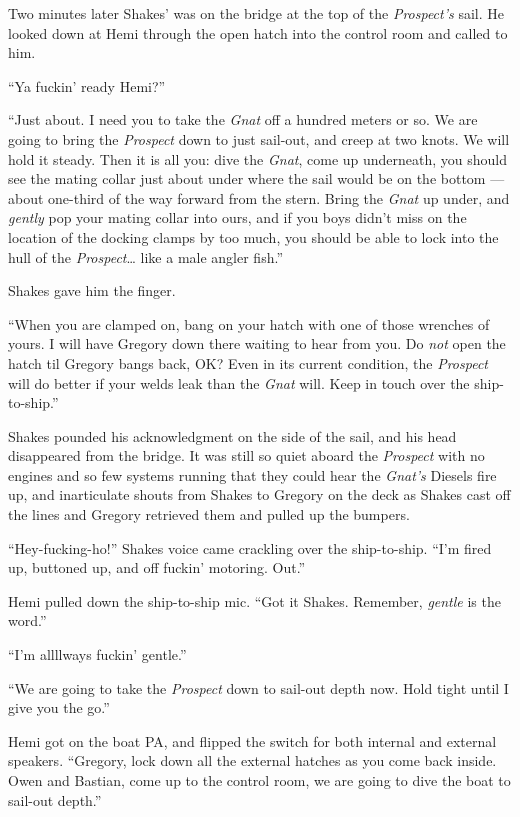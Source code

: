 \documentclass[
]{scrbook}
\begin{document}
Two minutes later Shakes' was on the bridge at the top of the
\emph{Prospect's} sail. He looked down at Hemi through the open hatch
into the control room and called to him.

``Ya fuckin' ready Hemi?''

``Just about. I need you to take the \emph{Gnat} off a hundred meters or
so. We are going to bring the \emph{Prospect} down to just sail-out, and
creep at two knots. We will hold it steady. Then it is all you: dive the
\emph{Gnat}, come up underneath, you should see the mating collar just
about under where the sail would be on the bottom --- about one-third of
the way forward from the stern. Bring the \emph{Gnat} up under, and
\emph{gently} pop your mating collar into ours, and if you boys didn't
miss on the location of the docking clamps by too much, you should be
able to lock into the hull of the \emph{Prospect}\ldots{} like a male
angler fish.''

Shakes gave him the finger.

``When you are clamped on, bang on your hatch with one of those wrenches
of yours. I will have Gregory down there waiting to hear from you. Do
\emph{not} open the hatch til Gregory bangs back, OK? Even in its
current condition, the \emph{Prospect} will do better if your welds leak
than the \emph{Gnat} will. Keep in touch over the ship-to-ship.''

Shakes pounded his acknowledgment on the side of the sail, and his head
disappeared from the bridge. It was still so quiet aboard the
\emph{Prospect} with no engines and so few systems running that they
could hear the \emph{Gnat's} Diesels fire up, and inarticulate shouts
from Shakes to Gregory on the deck as Shakes cast off the lines and
Gregory retrieved them and pulled up the bumpers.

``Hey-fucking-ho!'' Shakes voice came crackling over the ship-to-ship.
``I'm fired up, buttoned up, and off fuckin' motoring. Out.''

Hemi pulled down the ship-to-ship mic. ``Got it Shakes. Remember,
\emph{gentle} is the word.''

``I'm allllways fuckin' gentle.''

``We are going to take the \emph{Prospect} down to sail-out depth now.
Hold tight until I give you the go.''

Hemi got on the boat PA, and flipped the switch for both internal and
external speakers. ``Gregory, lock down all the external hatches as you
come back inside. Owen and Bastian, come up to the control room, we are
going to dive the boat to sail-out depth.''
\end{document}
